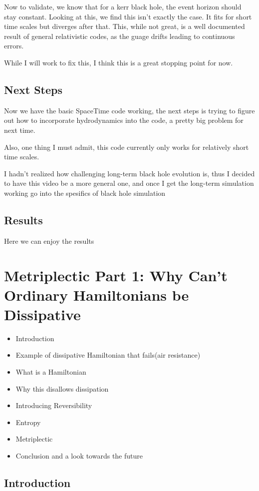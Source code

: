 Now to validate, we know that for a kerr black hole, the event horizon should stay constant. Looking at this, we find this isn't exactly the case. It fits for short time scales but diverges after that. This, while not great, is a well documented result of general relativistic codes, as the guage drifts leading to continuous errors.

While I will work to fix this, I think this is a great stopping point for now.
\subsection{Next Steps}
Now we have the basic SpaceTime code working, the next steps is trying to figure out how to incorporate hydrodynamics into the code, a pretty big problem for next time.

Also, one thing I must admit, this code currently only works for relatively short time scales.

I hadn't realized how challenging long-term black hole evolution is, thus I decided to have this video be a more general one, and once I get the long-term simulation working go into the spesifics of black hole simulation
\subsection{Results}
Here we can enjoy the results



\section{Metriplectic Part 1: Why Can't Ordinary Hamiltonians be Dissipative}
\begin{itemize}
	\item Introduction
	\item Example of dissipative Hamiltonian that fails(air resistance)
	\item What is a Hamiltonian
	\item Why this disallows dissipation
	\item Introducing Reversibility
	\item Entropy
	\item Metriplectic
	\item Conclusion and a look towards the future
\end{itemize}

\subsection{Introduction}

